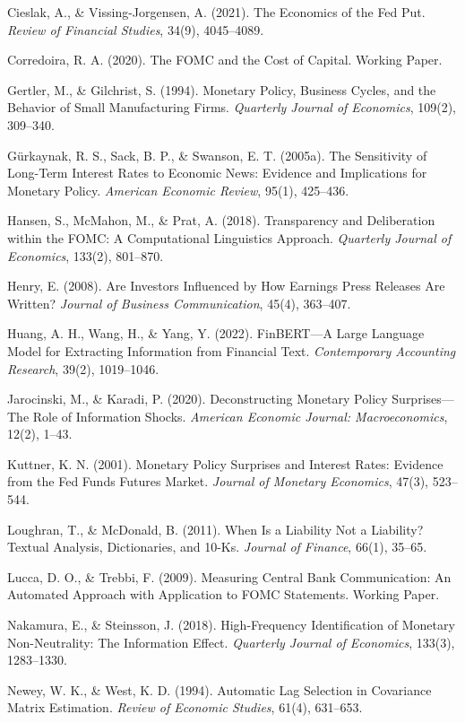 Cieslak, A., \& Vissing-Jorgensen, A. (2021). The Economics of the Fed Put. \textit{Review of Financial Studies}, 34(9), 4045--4089.

Corredoira, R. A. (2020). The FOMC and the Cost of Capital. Working Paper.

Gertler, M., \& Gilchrist, S. (1994). Monetary Policy, Business Cycles, and the Behavior of Small Manufacturing Firms. \textit{Quarterly Journal of Economics}, 109(2), 309--340.

G\"urkaynak, R. S., Sack, B. P., \& Swanson, E. T. (2005a). The Sensitivity of Long-Term Interest Rates to Economic News: Evidence and Implications for Monetary Policy. \textit{American Economic Review}, 95(1), 425--436.

Hansen, S., McMahon, M., \& Prat, A. (2018). Transparency and Deliberation within the FOMC: A Computational Linguistics Approach. \textit{Quarterly Journal of Economics}, 133(2), 801--870.

Henry, E. (2008). Are Investors Influenced by How Earnings Press Releases Are Written? \textit{Journal of Business Communication}, 45(4), 363--407.

Huang, A. H., Wang, H., \& Yang, Y. (2022). FinBERT---A Large Language Model for Extracting Information from Financial Text. \textit{Contemporary Accounting Research}, 39(2), 1019--1046.

Jarocinski, M., \& Karadi, P. (2020). Deconstructing Monetary Policy Surprises---The Role of Information Shocks. \textit{American Economic Journal: Macroeconomics}, 12(2), 1--43.

Kuttner, K. N. (2001). Monetary Policy Surprises and Interest Rates: Evidence from the Fed Funds Futures Market. \textit{Journal of Monetary Economics}, 47(3), 523--544.

Loughran, T., \& McDonald, B. (2011). When Is a Liability Not a Liability? Textual Analysis, Dictionaries, and 10-Ks. \textit{Journal of Finance}, 66(1), 35--65.

Lucca, D. O., \& Trebbi, F. (2009). Measuring Central Bank Communication: An Automated Approach with Application to FOMC Statements. Working Paper.

Nakamura, E., \& Steinsson, J. (2018). High-Frequency Identification of Monetary Non-Neutrality: The Information Effect. \textit{Quarterly Journal of Economics}, 133(3), 1283--1330.

Newey, W. K., \& West, K. D. (1994). Automatic Lag Selection in Covariance Matrix Estimation. \textit{Review of Economic Studies}, 61(4), 631--653.


